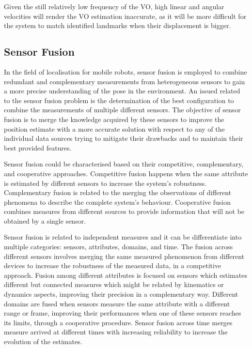 
Given the still relatively low frequency of the \gls{VO}, high linear and angular velocities will render the \gls{VO} estimation inaccurate, as it will be more difficult for the system to match identified landmarks when their displacement is bigger.



\subsection{Sensor Fusion}

\noindent
In the field of localisation for mobile robots, sensor fusion is employed to combine redundant and complementary measurements from heterogeneous sensors to gain a more precise understanding of the pose in the environment.
An issued related to the sensor fusion problem is the determination of the best configuration to combine the measurements of multiple different sensors.
The objective of sensor fusion is to merge the knowledge acquired by these sensors to improve the position estimate with a more accurate solution with respect to any of the individual data sources trying to mitigate their drawbacks and to maintain their best provided features\cite{mitchell_multi-sensor_2007}.

Sensor fusion could be characterised based on their competitive, complementary, and cooperative approaches\cite{1199023}.
Competitive fusion happens when the same attribute is estimated by different sensors to increase the system's robustness.
Complementary fusion is related to the merging the observations of different phenomena to describe the complete system's behaviour.
Cooperative fusion combines measures from different sources to provide information that will not be obtained by a single sensor.

Sensor fusion is related to independent measures and it can be differentiate into multiple categories: sensors, attributes, domains, and time\cite{weckenmann_multisensor_2009}.
The fusion across different sensors involves merging the same measured phenomenon from different devices to increase the robustness of the measured data, in a competitive approach.
Fusion among different attributes is focused on sensors which estimates different but connected measures which might be related by kinematics or dynamics aspects, improving their precision in a complementary way.
Different domains are fused when sensors measure the same attribute with a different range or frame, improving their performances when one of these sensors reaches its limits, through a cooperative procedure.
Sensor fusion across time merges measure arrived at different times with increasing reliability to increase the evolution of the estimates.


